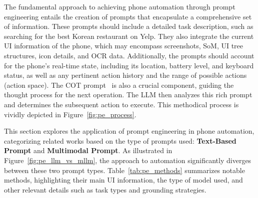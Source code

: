 The fundamental approach to achieving phone automation through prompt engineering entails the creation of prompts that encapsulate a comprehensive set of information. These prompts should include a detailed task description, such as searching for the best Korean restaurant on Yelp. They also integrate the current UI information of the phone, which may encompass screenshots, SoM, UI tree structures, icon details, and OCR data. Additionally, the prompts should account for the phone's real-time state, including its location, battery level, and keyboard status, as well as any pertinent action history and the range of possible actions (action space). The COT prompt~\cite{wei2022chain,zhang2023igniting} is also a crucial component, guiding the thought process for the next operation. The LLM then analyzes this rich prompt and determines the subsequent action to execute. This methodical process is vividly depicted in Figure~\ref{fig:pe_process}.

This section explores the application of prompt engineering in phone automation, categorizing related works based on the type of prompts used: \textbf{Text-Based Prompt} and \textbf{Multimodal Prompt}. As illustrated in Figure~\ref{fig:pe_llm_vs_mllm}, the approach to automation significantly diverges between these two prompt types. Table~\ref{tab:pe_methods} summarizes notable methods, highlighting their main UI information, the type of model used, and other relevant details such as task types and grounding strategies.

